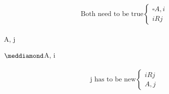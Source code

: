 \documentclass[12pt, fleqn]{article}
\begin{document}
\begin{multicols}{2}
\begin{equation*}
  \text{Both need to be true}\begin{cases}
    \square A, i&\\
    iRj&
  \end{cases}
\end{equation*}
\hspace*{5.25cm}{\Large $\downarrow$}\\
\hspace*{5cm}A, j\\
\vspace{1in}

\hspace*{3.75cm}$\meddiamond$A, i\\
\hspace*{4.25cm}{\Large $\downarrow$}\\
\begin{equation*}
  \text{j has to be new}\begin{cases}
    iRj&\\
    A,j
  \end{cases}
\end{equation*}
\end{multicols}

\vspace{1cm}
\end{document}
